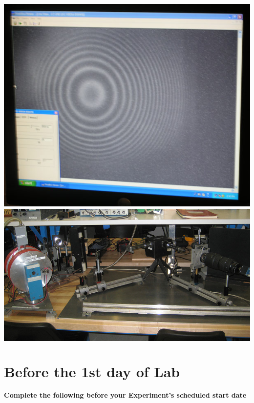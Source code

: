 \documentclass{../lab}
\begin{document}
\href{http://experimentationlab.berkeley.edu/sites/default/files/images/Atm_5.jpg}{\includegraphics[width=0.33\linewidth,keepaspectratio]{images/Atm_5.jpg}}
\href{http://experimentationlab.berkeley.edu/sites/default/files/images/ATM_Zeeman_3489-Crop-Lg.jpg}{\includegraphics[width=\linewidth,keepaspectratio]{images/ATM_Zeeman_3489-Crop-Lg.jpg}}

\section{Before the 1st day of Lab}

\textbf{Complete the following before your Experiment's scheduled start date}
\end{document}
